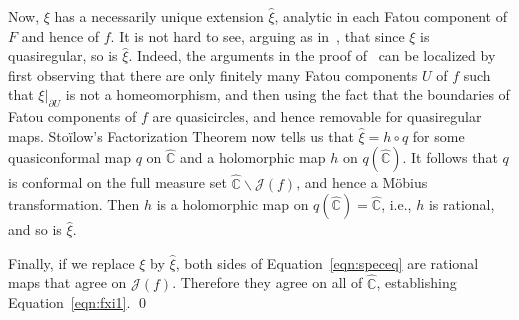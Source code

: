 \documentclass[12pt]{amsart}
\newtheorem*{rmk}{Remark}
\newcommand{\C}{\mathbb{C}}
\newcommand{\hC}{\widehat{\C}}
\newcommand{\J}{\mathcal{J}}
\newcommand{\co}{\colon}
\begin{document}
  Now, $\xi$ has a necessarily unique extension $\widehat{\xi}$, analytic in each Fatou component of $F$ and hence of $f$. It is not hard to see, arguing as in~\cite[Lemma~2.1]{BLM}, %
  that since $\xi$ is quasiregular, so is $\widehat{\xi}$. Indeed, the arguments in the proof of~\cite[Lemma~2.1]{BLM} can be localized by first observing that there are only finitely many Fatou components $U$ of $f$ such that $\xi|_{\partial U}$ is not a homeomorphism, and then using the fact that the boundaries of Fatou components of $f$ are quasicircles, and hence removable for quasiregular maps.  Sto\"ilow's Factorization Theorem now tells us that 
  $\widehat{\xi}=h\circ q$ for some quasiconformal map $q$ on $\hC$ and a holomorphic map $h$ on $q(\hC)$.
  It follows that $q$ is conformal on the full measure set $\hC\backslash \J(f)$, and hence a M\"obius transformation. 
  Then $h$ is a holomorphic map on $q(\hC)=\hC$, i.e., $h$ is rational, and so is $\widehat{\xi}$. 
  
  Finally, if we replace $\xi$ by $\widehat\xi$, both sides of Equation~\eqref{eqn:speceq} are rational maps that agree on $\J(f)$. Therefore they agree on all of $\hC$, establishing Equation~\eqref{eqn:fxi1}.
\qed


\end{document}
